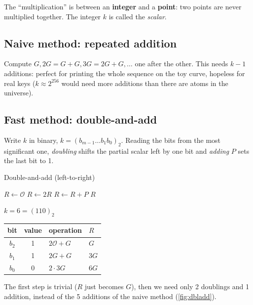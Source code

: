 The ``multiplication'' is between an \textbf{integer} and a \textbf{point}: two points are never multiplied together. The integer $k$ is called the \textit{scalar}.

\subsection{Naive method: repeated addition}

Compute $G, 2G = G + G, 3G = 2G + G, \ldots$ one after the other. This needs $k-1$ additions: perfect for printing the whole sequence on the toy curve, hopeless for real keys ($k \approx 2^{256}$ would need more additions than there are atoms in the universe).

\subsection{Fast method: double-and-add}

Write $k$ in binary, $k = (b_{m-1} \ldots b_1 b_0)_2$. Reading the bits from the most significant one, \textit{doubling} shifts the partial scalar left by one bit and \textit{adding} $P$ sets the last bit to 1.

\begin{framedalgo}[label={alg:dbladd}]{Double-and-add (left-to-right)}
  \begin{algorithmic}[1]
      \State $R \gets \mathcal{O}$
        \State $R \gets 2R$ 
          \State $R \gets R + P$ 
        \EndIf
      \EndFor
      \State \Return $R$
    \EndFunction
  \end{algorithmic}
\end{framedalgo}

\begin{framedex}{$k = 6 = (110)_2$}
  \begin{center}
    \begin{tabular}{c c l l}
      \toprule
      bit & value & operation & $R$ \\
      \midrule
      $b_2$ & 1 & $2\mathcal{O} + G$ & $G$ \\
      $b_1$ & 1 & $2G + G$ & $3G$ \\
      $b_0$ & 0 & $2 \cdot 3G$ & $6G$ \\
      \bottomrule
    \end{tabular}
  \end{center}
  The first step is trivial ($R$ just becomes $G$), then we need only 2 doublings and 1 addition, instead of the 5 additions of the naive method (\cref{fig:dbladd}).
\end{framedex}

